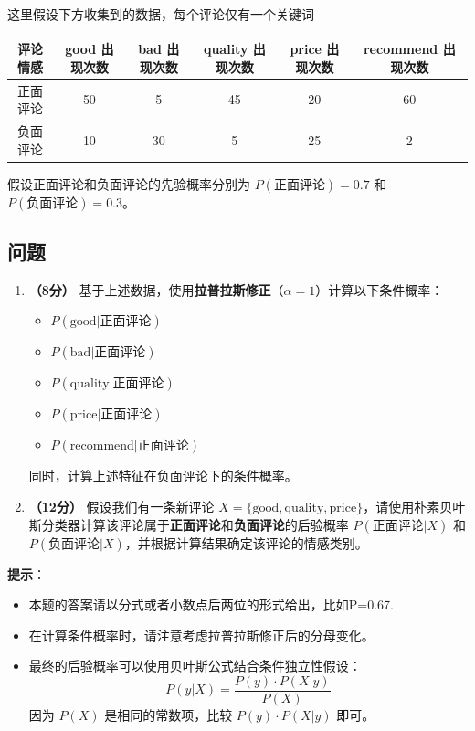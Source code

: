 \documentclass[8pt]{article}
\begin{document}
{\color{blue}这里假设下方收集到的数据，每个评论仅有一个关键词}

\begin{table}[h!]\small
    \centering
    \begin{tabular}{|c|c|c|c|c|c|}
        \hline
        评论情感 & good 出现次数 & bad 出现次数 & quality 出现次数 & price 出现次数 & recommend 出现次数 \\
        \hline
        正面评论 & 50 & 5 & 45 & 20 & 60 \\
        \hline
        负面评论 & 10 & 30 & 5 & 25 & 2 \\
        \hline
    \end{tabular}
\end{table}

假设正面评论和负面评论的先验概率分别为 \( P(\text{正面评论}) = 0.7 \) 和 \( P(\text{负面评论}) = 0.3 \)。

\subsection*{问题}

\begin{enumerate}
    \item \textbf{（8分）} 基于上述数据，使用\textbf{拉普拉斯修正}（\(\alpha = 1\)）计算以下条件概率：
        \begin{itemize}
            \item \( P(\text{good} | \text{正面评论}) \)
            \item \( P(\text{bad} | \text{正面评论}) \)
            \item \( P(\text{quality} | \text{正面评论}) \)
            \item \( P(\text{price} | \text{正面评论}) \)
            \item \( P(\text{recommend} | \text{正面评论}) \)
        \end{itemize}
    同时，计算上述特征在负面评论下的条件概率。

    \item \textbf{（12分）} 假设我们有一条新评论 \( X = \{\text{good}, \text{quality}, \text{price}\} \)，请使用朴素贝叶斯分类器计算该评论属于\textbf{正面评论}和\textbf{负面评论}的后验概率 \( P(\text{正面评论} | X) \) 和 \( P(\text{负面评论} | X) \)，并根据计算结果确定该评论的情感类别。
\end{enumerate}

\textbf{提示}：
\begin{itemize}
    \item 本题的答案请以分式或者小数点后两位的形式给出，比如P=0.67.
    \item 在计算条件概率时，请注意考虑拉普拉斯修正后的分母变化。
    \item 最终的后验概率可以使用贝叶斯公式结合条件独立性假设：
    \[
    P(y|X) = \frac{P(y) \cdot P(X|y)}{P(X)}
    \]
    因为 \( P(X) \) 是相同的常数项，比较 \( P(y) \cdot P(X|y) \) 即可。
\end{itemize}
\end{document}
